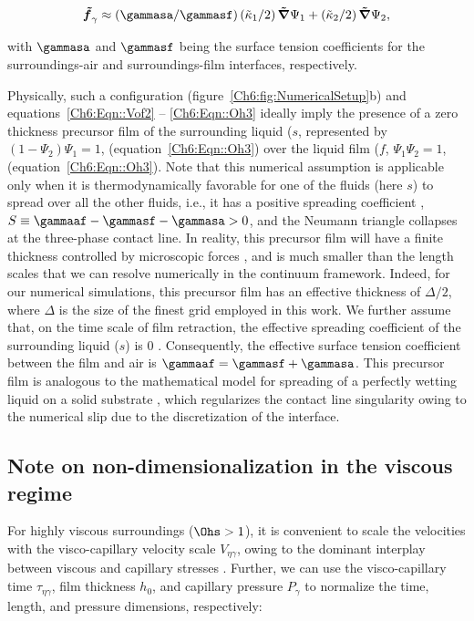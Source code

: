 \begin{align}\label{Ch6:Eqn::SurfaceTension2}
	\boldsymbol{\tilde{f}}_\gamma \approx \left(\gammasa/\gammasf\right)\left(\tilde{\kappa}_1/2\right)\boldsymbol{\tilde{\nabla}}\Psi_1 + \left(\tilde{\kappa}_2/2\right)\boldsymbol{\tilde{\nabla}}\Psi_2,
\end{align}

\noindent with $\gammasa$ and $\gammasf$ being the surface tension coefficients for the surroundings-air and surroundings-film interfaces, respectively. 

Physically, such a configuration (figure~\ref{Ch6:fig:NumericalSetup}b) and equations~\eqref{Ch6:Eqn::Vof2} -- \eqref{Ch6:Eqn::Oh3} ideally imply the presence of a zero thickness precursor film of the surrounding liquid ($s$, represented by $(1-\Psi_2)\Psi_1 = 1$, (equation~\eqref{Ch6:Eqn::Oh3}) over the liquid film ($f$, $\Psi_1\Psi_2 = 1$, (equation~\eqref{Ch6:Eqn::Oh3}). Note that this numerical assumption is applicable only when it is thermodynamically favorable for one of the fluids (here $s$) to spread over all the other fluids, i.e., it has a positive spreading coefficient \citep{book-degennes, berthier2012physics}, $S \equiv \gammaaf - \gammasf - \gammasa > 0$, and the Neumann triangle collapses at the three-phase contact line. In reality, this precursor film will have a finite thickness controlled by microscopic forces \citep[like van der Waals forces,][]{vaynblat-2001-pof}, and is much smaller than the length scales that we can resolve numerically in the continuum framework. Indeed, for our numerical simulations, this precursor film has an effective thickness of $\Delta /2$, where $\Delta$ is the size of the finest grid employed in this work. We further assume that, on the time scale of film retraction, the effective spreading coefficient of the surrounding liquid ($s$) is $0$ \citep{bonn2009wetting}. Consequently, the effective surface tension coefficient between the film and air is $\gammaaf = \gammasf+\gammasa$. This precursor film \citep{thoraval-2013-pre} is analogous to the mathematical model for spreading of a perfectly wetting liquid on a solid substrate \citep{book-degennes, bonn2009wetting}, which regularizes the contact line singularity owing to the numerical slip \citep[with an effective slip length of $\Delta$/2,][]{afkhami2018transition} due to the discretization of the interface.

\subsection{Note on non-dimensionalization in the viscous regime}\label{Ch6:sec::ViscousScaling}
For highly viscous surroundings ($\Ohs > 1$), it is convenient to scale the velocities with the visco-capillary velocity scale $V_{\eta\gamma}$, owing to the dominant interplay between viscous and capillary stresses \citep{stone1989relaxation}. Further, we can use the visco-capillary time $\tau_{\eta\gamma}$, film thickness $h_0$, and capillary pressure $P_\gamma$ to normalize the time, length, and pressure dimensions, respectively:

